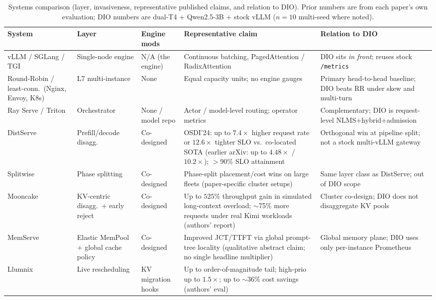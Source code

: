 \documentclass[pdflatex,sn-mathphys-num]{sn-jnl}
\begin{document}
\begin{table}[!t]
\caption{Systems comparison (layer, invasiveness, representative published claims,
and relation to DIO). Prior numbers are from each paper's own evaluation; DIO
numbers are dual-T4 + Qwen2.5-3B + stock vLLM ($n{=}10$ multi-seed where noted).}
\label{tab:sys-compare}
\centering
\footnotesize
\setlength{\tabcolsep}{3pt}
\begin{tabular}{@{}p{1.55cm}p{2.0cm}p{1.35cm}p{3.55cm}p{3.7cm}@{}}
\toprule
System & Layer & Engine mods & Representative claim & Relation to DIO \\
\midrule
vLLM / SGLang / TGI
  & Single-node engine
  & N/A (the engine)
  & Continuous batching, PagedAttention / RadixAttention
  & DIO sits \emph{in front}; reuses stock \texttt{/metrics} \\
Round-Robin / least-conn.\ (Nginx, Envoy, K8s)
  & L7 multi-instance
  & None
  & Equal capacity units; no engine gauges
  & Primary head-to-head baseline; DIO beats RR under skew and multi-turn \\
Ray Serve / Triton
  & Orchestrator
  & None / model repo
  & Actor / model-level routing; operator metrics
  & Complementary; DIO is request-level NLMS+hybrid+admission \\
DistServe~\cite{distserve}
  & Prefill/decode disagg.
  & Co-designed
  & OSDI'24: up to $7.4\times$ higher request rate or $12.6\times$ tighter SLO vs.\ co-located SOTA (earlier arXiv: up to $4.48\times$ / $10.2\times$); $>$90\% SLO attainment
  & Orthogonal win at pipeline split; not a stock multi-vLLM gateway \\
Splitwise~\cite{splitwise}
  & Phase splitting
  & Co-designed
  & Phase-split placement/cost wins on large fleets (paper-specific cluster setups)
  & Same layer class as DistServe; out of DIO scope \\
Mooncake~\cite{mooncake}
  & KV-centric disagg.\ + early reject
  & Co-designed
  & Up to $525\%$ throughput gain in simulated long-context overload; $\sim$75\% more requests under real Kimi workloads (authors' report)
  & Cluster co-design; DIO does not disaggregate KV pools \\
MemServe~\cite{memserve}
  & Elastic MemPool + global cache policy
  & Co-designed
  & Improved JCT/TTFT via global prompt-tree locality (qualitative abstract claim; no single headline multiplier)
  & Global memory plane; DIO uses only per-instance Prometheus \\
Llumnix~\cite{llumnix}
  & Live rescheduling
  & KV migration hooks
  & Up to order-of-magnitude tail; high-prio up to $1.5\times$; up to $\sim$36\% cost savings (authors' eval)

\end{tabular}
\end{table}
\end{document}
